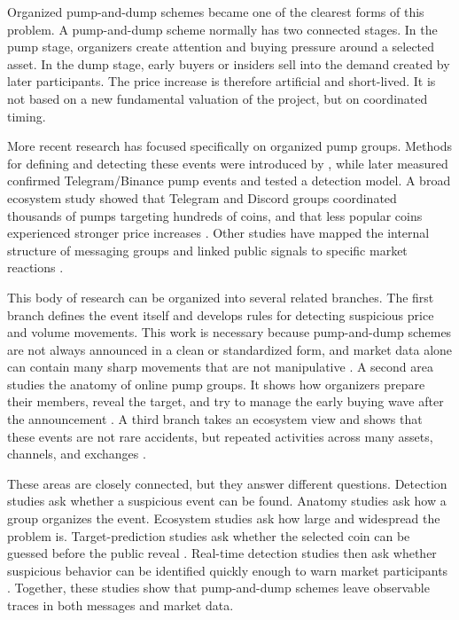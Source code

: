 Organized pump-and-dump schemes became one of the clearest forms of this problem. A pump-and-dump scheme normally has two connected stages. In the pump stage, organizers create attention and buying pressure around a selected asset. In the dump stage, early buyers or insiders sell into the demand created by later participants. The price increase is therefore artificial and short-lived. It is not based on a new fundamental valuation of the project, but on coordinated timing.

More recent research has focused specifically on organized pump groups. Methods for defining and detecting these events were introduced by \cite{kamps2018pump}, while \cite{victor2019cryptocurrency} later measured confirmed Telegram/Binance pump events and tested a detection model. A broad ecosystem study showed that Telegram and Discord groups coordinated thousands of pumps targeting hundreds of coins, and that less popular coins experienced stronger price increases \cite{hamrick2021examination}. Other studies have mapped the internal structure of messaging groups and linked public signals to specific market reactions \cite{xu2019anatomy, li2021cryptocurrency}.

This body of research can be organized into several related branches. The first branch defines the event itself and develops rules for detecting suspicious price and volume movements. This work is necessary because pump-and-dump schemes are not always announced in a clean or standardized form, and market data alone can contain many sharp movements that are not manipulative \cite{kamps2018pump, victor2019cryptocurrency}. A second area studies the anatomy of online pump groups. It shows how organizers prepare their members, reveal the target, and try to manage the early buying wave after the announcement \cite{xu2019anatomy, lamorgia2023doge}. A third branch takes an ecosystem view and shows that these events are not rare accidents, but repeated activities across many assets, channels, and exchanges \cite{hamrick2021examination, li2021cryptocurrency}.

These areas are closely connected, but they answer different questions. Detection studies ask whether a suspicious event can be found. Anatomy studies ask how a group organizes the event. Ecosystem studies ask how large and widespread the problem is. Target-prediction studies ask whether the selected coin can be guessed before the public reveal \cite{hu2023sequence}. Real-time detection studies then ask whether suspicious behavior can be identified quickly enough to warn market participants \cite{lamorgia2020pump, lamorgia2023doge}. Together, these studies show that pump-and-dump schemes leave observable traces in both messages and market data.

